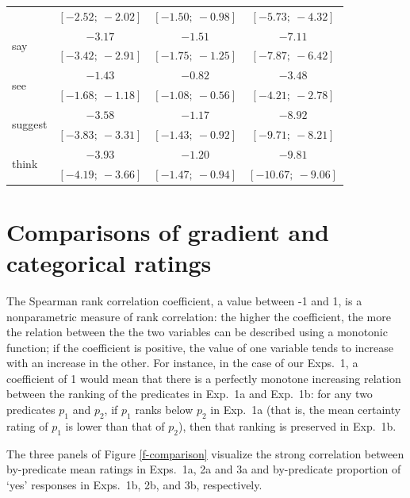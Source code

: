 \documentclass[11pt,fleqn]{article}
\newcommand{\6}{\mbox{$[\hspace*{-.6mm}[$}}
\newcommand{\9}{\mbox{$]\hspace*{-.6mm}]$}}
\begin{document}
\begin{table}
\begin{center}
\begin{tabular}{l c c c}
                         & $[-2.52;\ -2.02]$ & $[-1.50;\ -0.98]$ & $[-5.73;\ -4.32]$   \\
\multirow{2}{*}{say}               & $-3.17$       & $-1.51$       & $-7.11$         \\
                         & $[-3.42;\ -2.91]$ & $[-1.75;\ -1.25]$ & $[-7.87;\ -6.42]$   \\
\multirow{2}{*}{see}               & $-1.43$       & $-0.82$       & $-3.48$         \\
                         & $[-1.68;\ -1.18]$ & $[-1.08;\ -0.56]$ & $[-4.21;\ -2.78]$   \\
\multirow{2}{*}{suggest}           & $-3.58$       & $-1.17$       & $-8.92$         \\
                         & $[-3.83;\ -3.31]$ & $[-1.43;\ -0.92]$ & $[-9.71;\ -8.21]$   \\
\multirow{2}{*}{think}             & $-3.93$       & $-1.20$       & $-9.81$         \\
                         & $[-4.19;\ -3.66]$ & $[-1.47;\ -0.94]$ & $[-10.67;\ -9.06]$  \\
\bottomrule
\end{tabular}
\label{tab:exp3modelresults}
\end{center}
\end{table}

\normalsize


\section{Comparisons of gradient and categorical ratings}\label{a-comparison}

The Spearman rank correlation coefficient, a value between -1 and 1, is a nonparametric measure of rank correlation: the higher the coefficient, the more the relation between the the two variables can be described using a monotonic function; if the coefficient is positive, the value of one variable tends to increase with an increase in the other. For instance, in the case of our Exps.~1, a coefficient of 1 would mean that there is a perfectly monotone increasing relation between the ranking of the predicates in Exp.~1a and Exp.~1b: for any two predicates $p_1$ and $p_2$, if $p_1$ ranks below $p_2$ in Exp.~1a (that is, the mean certainty rating of $p_1$ is lower than that of $p_2$), then that ranking is preserved in Exp.~1b.

The three panels of Figure \ref{f-comparison} visualize the strong correlation between by-predicate mean ratings in Exps.~1a, 2a and 3a and by-predicate proportion of `yes' responses in Exps.~1b, 2b, and 3b, respectively.
\end{document}
